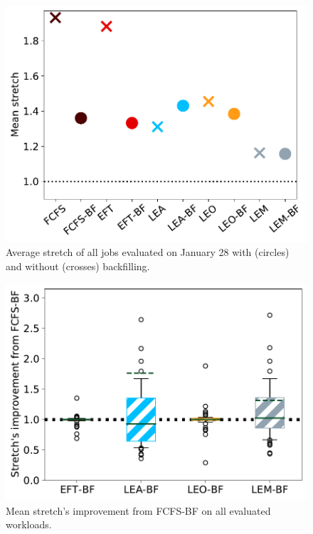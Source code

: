 \documentclass[sigconf,review,anonymous]{acmart}
\begin{document}
\begin{figure}[t]\centering\includegraphics[width=0.9\linewidth]{../MBSS/plot/BF_AND_NON_BF_Results_FCFS_Score_Backfill_2022-01-28->2022-01-28_V10000_Mean_Stretch_450_128_32_256_4_1024.pdf}\caption{Average stretch of all jobs evaluated on January 28 with (circles) and without (crosses) backfilling.}\label{stretch.01-28}\end{figure}
\begin{figure}[t]\centering\includegraphics[width=0.9\linewidth]{../MBSS/plot/Boxplot/box_plot_mean_stretch_all_workloads_bf.pdf}\caption{Mean stretch's improvement from FCFS-BF on all evaluated workloads.}\label{boxplot.all_bf}\end{figure}
\end{document}
